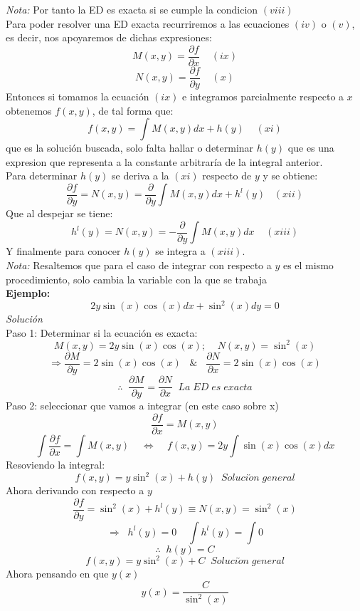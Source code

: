 \documentclass[10pt,executivepaper]{article}
\begin{document}
\textit{Nota:} Por tanto la ED es exacta si se cumple la condicion $(viii)$\\
Para poder resolver una ED exacta recurriremos a las ecuaciones $(iv)$ o $(v)$, es decir, nos apoyaremos de dichas expresiones:
\[M(x,y)=\frac{\partial{f}}{\partial{x}}\;\;\;\;(ix)\]
\[N(x,y)=\frac{\partial{f}}{\partial{y}}\;\;\;\;(x)\]
Entonces si tomamos la ecuación $(ix)$ e integramos parcialmente respecto a $x$ obtenemos $f(x,y)$, de tal forma que:
\[f(x,y)=\int M(x,y)dx+h(y)\;\;\;\;(xi)\]
que es la solución buscada, solo falta hallar o determinar $h(y)$ que es una expresion que representa a la constante arbitraría de la integral anterior.
\\
Para determinar $h(y)$ se deriva a la $(xi)$ respecto de $y$ y se obtiene:
\[\frac{\partial{f}}{\partial{y}}=N(x,y)=\frac{\partial}{\partial{y}}\int M(x,y)dx + h^{l}(y)\;\;\;(xii)\]
Que al despejar se tiene:
\[h^{l}(y)=N(x,y)=-\frac{\partial}{\partial{y}}\int M(x,y)dx\;\;\;\;(xiii)\]
Y finalmente para conocer $h(y)$ se integra a $(xiii)$.
\\
\textit{Nota: }Resaltemos que para el caso de integrar con respecto a $y$ es el mismo procedimiento, solo cambia la variable con la que se trabaja\\
\clearpage
\textbf{Ejemplo:}
\\
\[2y\sin(x)\cos(x)dx+\sin^{2}(x)dy=0\]
\textit{Solución}\\
Paso 1: Determinar si la ecuación es exacta:
\[M(x,y)=2y\sin(x)\cos(x);\;\;\;\;N(x,y)=\sin^{2}(x)\]
\[\Rightarrow \frac{\partial{M}}{\partial{y}}=2\sin(x)\cos(x)\;\;\;\&\;\;\;\frac{\partial{N}}{\partial{x}}=2\sin(x)\cos(x)\]
\[\therefore\;\;\frac{\partial{M}}{\partial{y}}=\frac{\partial{N}}{\partial{x}}\;\;La\;ED\;es\;exacta\]
Paso 2: seleccionar que vamos a integrar (en este caso sobre x)
\[\frac{\partial{f}}{\partial{x}}=M(x,y)\]
\[\int\frac{\partial{f}}{\partial{x}}=\int M(x,y)\;\;\;\;\Leftrightarrow\;\;\;\;f(x,y)=2y\int\sin(x)\cos(x)dx\]
Resoviendo la integral:
\[f(x,y)=y\sin^{2}(x)+h(y)\;\;Soluci\acute{o}n\;general\]
Ahora derivando con respecto a $y$
\[\frac{\partial{f}}{\partial{y}}=\sin^{2}(x)+h^{l}(y)\equiv N(x,y)=\sin^{2}(x)\]
\[\Rightarrow\;\;h^{l}(y)=0\;\;\;\;\int h^{l}(y)=\int 0\]
\[\therefore\;\;h(y)=C\]
\[f(x,y)=y\sin^{2}(x)+C\;\;Soluci\acute{o}n\;general\]
Ahora pensando en que $y(x)$
\[y(x)=\frac{C}{\sin^{2}(x)}\]

\printindex
\end{document}
